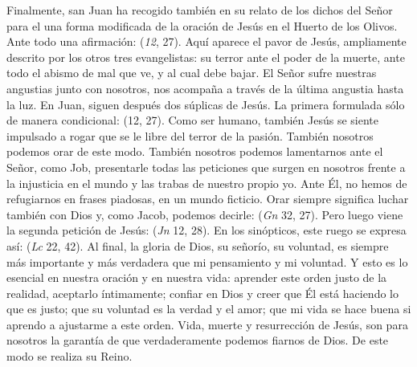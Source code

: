 \begin{body}
Finalmente, san Juan ha recogido también en su relato de los dichos del Señor para el  una forma modificada de la oración de Jesús en el Huerto de los Olivos. Ante todo una afirmación:  (\textit{12}, 27). Aquí aparece el pavor de Jesús, ampliamente descrito por los otros tres evangelistas: su terror ante el poder de la muerte, ante todo el abismo de mal que ve, y al cual debe bajar. El Señor sufre nuestras angustias junto con nosotros, nos acompaña a través de la última angustia hasta la luz. En Juan, siguen después dos súplicas de Jesús. La primera formulada sólo de manera condicional:  (12, 27). Como ser humano, también Jesús se siente impulsado a rogar que se le libre del terror de la pasión. También nosotros podemos orar de este modo. También nosotros podemos lamentarnos ante el Señor, como Job, presentarle todas las peticiones que surgen en nosotros frente a la injusticia en el mundo y las trabas de nuestro propio yo. Ante Él, no hemos de refugiarnos en frases piadosas, en un mundo ficticio. Orar siempre significa luchar también con Dios y, como Jacob, podemos decirle:  (\textit{Gn} 32, 27). Pero luego viene la segunda petición de Jesús:  (\textit{Jn} 12, 28). En los sinópticos, este ruego se expresa así:  (\textit{Lc} 22, 42). Al final, la gloria de Dios, su señorío, su voluntad, es siempre más importante y más verdadera que mi pensamiento y mi voluntad. Y esto es lo esencial en nuestra oración y en nuestra vida: aprender este orden justo de la realidad, aceptarlo íntimamente; confiar en Dios y creer que Él está haciendo lo que es justo; que su voluntad es la verdad y el amor; que mi vida se hace buena si aprendo a ajustarme a este orden. Vida, muerte y resurrección de Jesús, son para nosotros la garantía de que verdaderamente podemos fiarnos de Dios. De este modo se realiza su Reino.


\end{body}
